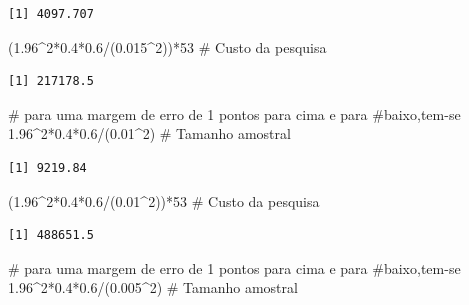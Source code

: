 \documentclass[
  letterpaper,
  DIV=11,
  numbers=noendperiod]{scrartcl}
\newenvironment{Shaded}{\begin{snugshade}}{\end{snugshade}}
\newcommand{\CommentTok}[1]{\textcolor[rgb]{0.37,0.37,0.37}{#1}}
\newcommand{\DecValTok}[1]{\textcolor[rgb]{0.68,0.00,0.00}{#1}}
\newcommand{\FloatTok}[1]{\textcolor[rgb]{0.68,0.00,0.00}{#1}}
\newcommand{\NormalTok}[1]{\textcolor[rgb]{0.00,0.23,0.31}{#1}}
\newcommand{\SpecialCharTok}[1]{\textcolor[rgb]{0.37,0.37,0.37}{#1}}
\begin{document}
\begin{verbatim}
[1] 4097.707
\end{verbatim}

\begin{Shaded}
\begin{Highlighting}[]
\NormalTok{(}\FloatTok{1.96}\SpecialCharTok{\^{}}\DecValTok{2}\SpecialCharTok{*}\FloatTok{0.4}\SpecialCharTok{*}\FloatTok{0.6}\SpecialCharTok{/}\NormalTok{(}\FloatTok{0.015}\SpecialCharTok{\^{}}\DecValTok{2}\NormalTok{))}\SpecialCharTok{*}\DecValTok{53} \CommentTok{\# Custo da pesquisa}
\end{Highlighting}
\end{Shaded}

\begin{verbatim}
[1] 217178.5
\end{verbatim}

\begin{Shaded}
\begin{Highlighting}[]
\CommentTok{\# para uma margem de erro de 1 pontos para cima e para }
\CommentTok{\#baixo,tem{-}se }
\FloatTok{1.96}\SpecialCharTok{\^{}}\DecValTok{2}\SpecialCharTok{*}\FloatTok{0.4}\SpecialCharTok{*}\FloatTok{0.6}\SpecialCharTok{/}\NormalTok{(}\FloatTok{0.01}\SpecialCharTok{\^{}}\DecValTok{2}\NormalTok{)  }\CommentTok{\# Tamanho amostral}
\end{Highlighting}
\end{Shaded}

\begin{verbatim}
[1] 9219.84
\end{verbatim}

\begin{Shaded}
\begin{Highlighting}[]
\NormalTok{(}\FloatTok{1.96}\SpecialCharTok{\^{}}\DecValTok{2}\SpecialCharTok{*}\FloatTok{0.4}\SpecialCharTok{*}\FloatTok{0.6}\SpecialCharTok{/}\NormalTok{(}\FloatTok{0.01}\SpecialCharTok{\^{}}\DecValTok{2}\NormalTok{))}\SpecialCharTok{*}\DecValTok{53} \CommentTok{\# Custo da pesquisa}
\end{Highlighting}
\end{Shaded}

\begin{verbatim}
[1] 488651.5
\end{verbatim}

\begin{Shaded}
\begin{Highlighting}[]
\CommentTok{\# para uma margem de erro de 1 pontos para cima e para }
\CommentTok{\#baixo,tem{-}se }
\FloatTok{1.96}\SpecialCharTok{\^{}}\DecValTok{2}\SpecialCharTok{*}\FloatTok{0.4}\SpecialCharTok{*}\FloatTok{0.6}\SpecialCharTok{/}\NormalTok{(}\FloatTok{0.005}\SpecialCharTok{\^{}}\DecValTok{2}\NormalTok{)  }\CommentTok{\# Tamanho amostral}
\end{Highlighting}
\end{Shaded}
\end{document}
